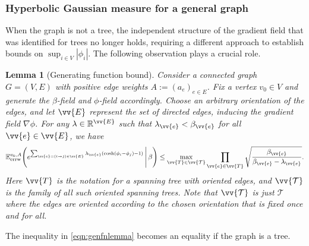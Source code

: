\documentclass[a4paper, 11pt]{article}
\newcommand{\E}{\mathbb{E}}
\newcommand{\Eerrw}{\E_{\textnormal{errw}}}
\newtheorem{lem}[thm]{Lemma}
\begin{document}
\subsubsection{Hyperbolic Gaussian measure for a general graph}

When the graph is not a tree, the independent structure of the gradient field that was identified for trees no longer holds, requiring a different approach to establish bounds on $\sup_{i\in V}|\phi_i|$. The following observation plays a crucial role.

\vspace{.3em}
\begin{lem}[Generating function bound]
\label{lem:general_mgf}
Consider a connected graph \( G = (V, E) \) with positive edge weights \( A := (a_e)_{e \in E} \). Fix a vertex \( v_0 \in V \) and generate the \( \beta \)-field and \( \phi \)-field accordingly. Choose an arbitrary orientation of the edges, and let \( \vv{E} \) represent the set of directed edges, inducing the gradient field \( \nabla \phi \). For any \( \lambda \in \mathbb{R}^{\vv{E}} \) such that \( \lambda_{\vv{e}} < \beta_{\vv{e}} \) for all \( \vv{e} \in \vv{E} \), we have
\begin{equation}    \label{eqn:genfnlemma}
\Eerrw^{v_0,A}\Bigg(e^{\sum_{\vv{e}=(i\to j)\in \vv{E}} \lambda_{\vv{e}}(\cosh(\phi_i - \phi_j) - 1)} \, \Bigg| \, \beta \Bigg) \leq \max_{\vv{T} \in \vv{\mathcal{T}}} \prod_{\vv{e} \in \vv{T}} \sqrt{\frac{\beta_{\vv{e}}}{\beta_{\vv{e}} - \lambda_{\vv{e}}}}.
\end{equation}
Here $\vv{T}$ is the notation for a spanning tree with oriented edges, and $\vv{\mathcal{T}}$ is the family of all such oriented spanning trees.
Note that $\vv{\mathcal{T}}$ is just $\mathcal{T}$ where the edges are oriented according to the chosen orientation that is fixed once and for all. 
\end{lem}
The inequality in \cref{eqn:genfnlemma} becomes an equality if the graph is a tree.
\end{document}
